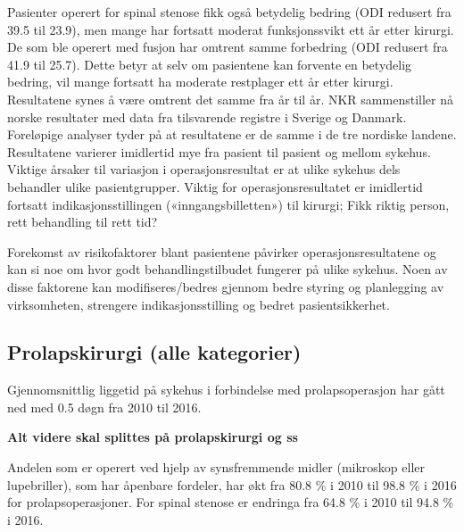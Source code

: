 \documentclass [norsk,a4paper,twoside]{article}\usepackage[]{graphicx}\usepackage[]{color}
\begin{document}
Pasienter operert for spinal stenose fikk også
betydelig bedring (ODI redusert fra 39.5 til 23.9), men mange har 
fortsatt moderat funksjonssvikt ett år etter kirurgi. 
De som ble operert med fusjon har
omtrent samme forbedring (ODI redusert fra 41.9 til 25.7). 
Dette betyr at selv om
pasientene kan forvente en betydelig bedring, vil mange fortsatt ha moderate restplager
ett år etter kirurgi. Resultatene synes å være omtrent det samme fra år til år. NKR
sammenstiller nå norske resultater med data fra tilsvarende registre i Sverige og
Danmark. Foreløpige analyser tyder på at resultatene er de samme i
de tre nordiske landene.
Resultatene varierer imidlertid mye fra pasient til pasient og mellom sykehus.
Viktige årsaker til variasjon i operasjonsresultat er at ulike sykehus dels behandler
ulike pasientgrupper. Viktig for operasjonsresultatet er imidlertid fortsatt
indikasjonsstillingen («inngangsbilletten») til kirurgi; Fikk riktig person, rett
behandling til rett tid?

Forekomst av risikofaktorer blant pasientene påvirker operasjonsresultatene og kan
si noe om hvor godt behandlingstilbudet fungerer på ulike sykehus. Noen av disse
faktorene kan modifiseres/bedres gjennom bedre styring og planlegging av
virksomheten, strengere indikasjonsstilling og bedret pasientsikkerhet.














\subsection{Prolapskirurgi (alle kategorier)}



Gjennomsnittlig liggetid på sykehus i forbindelse med prolapsoperasjon har gått ned med 0.5 døgn fra 2010 til 2016.



\textbf{Alt videre skal splittes på prolapskirurgi og ss}



Andelen som er operert ved hjelp av synsfremmende midler (mikroskop eller
lupebriller), som har åpenbare fordeler, har økt fra 80.8 \% i 2010 til 
98.8 \% i 2016 for prolapsoperasjoner. For spinal stenose er endringa fra 64.8 \% i 2010 til 
94.8 \% i 2016.
\end{document}
